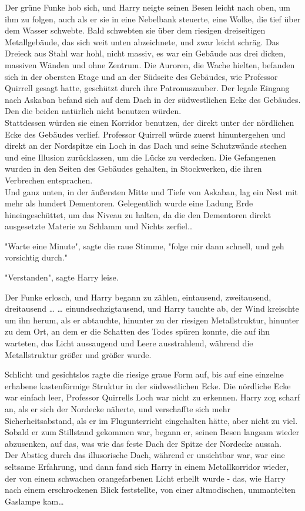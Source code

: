 {Der grüne Funke hob sich, und Harry neigte seinen Besen leicht nach oben, um ihm zu folgen, auch als er sie in eine Nebelbank steuerte, eine Wolke, die tief über dem Wasser schwebte. Bald schwebten sie über dem riesigen dreiseitigen Metallgebäude, das sich weit unten abzeichnete, und zwar leicht schräg. Das Dreieck aus Stahl war hohl, nicht massiv, es war ein Gebäude aus drei dicken, massiven Wänden und ohne Zentrum. Die Auroren, die Wache hielten, befanden sich in der obersten Etage und an der Südseite des Gebäudes, wie Professor Quirrell gesagt hatte, geschützt durch ihre Patronuszauber. Der legale Eingang nach Askaban befand sich auf dem Dach in der südwestlichen Ecke des Gebäudes. Den die beiden natürlich nicht benutzen würden.\\ Stattdessen würden sie einen Korridor benutzen, der direkt unter der nördlichen Ecke des Gebäudes verlief. Professor Quirrell würde zuerst hinuntergehen und direkt an der Nordspitze ein Loch in das Dach und seine Schutzwände stechen und eine Illusion zurücklassen, um die Lücke zu verdecken. Die Gefangenen wurden in den Seiten des Gebäudes gehalten, in Stockwerken, die ihren Verbrechen entsprachen.\\ Und ganz unten, in der äußersten Mitte und Tiefe von Askaban, lag ein Nest mit mehr als hundert Dementoren. Gelegentlich wurde eine Ladung Erde hineingeschüttet, um das Niveau zu halten, da die den Dementoren direkt ausgesetzte Materie zu Schlamm und Nichts zerfiel…

"Warte eine Minute", sagte die raue Stimme, "folge mir dann schnell, und geh vorsichtig durch."

"Verstanden", sagte Harry leise.

Der Funke erlosch, und Harry begann zu zählen, eintausend, zweitausend, dreitausend … … einundsechzigtausend, und Harry tauchte ab, der Wind kreischte um ihn herum, als er abtauchte, hinunter zu der riesigen Metallstruktur, hinunter zu dem Ort, an dem er die Schatten des Todes spüren konnte, die auf ihn warteten, das Licht aussaugend und Leere ausstrahlend, während die Metallstruktur größer und größer wurde.

Schlicht und gesichtslos ragte die riesige graue Form auf, bis auf eine einzelne erhabene kastenförmige Struktur in der südwestlichen Ecke. Die nördliche Ecke war einfach leer, Professor Quirrells Loch war nicht zu erkennen. Harry zog scharf an, als er sich der Nordecke näherte, und verschaffte sich mehr Sicherheitsabstand, als er im Flugunterricht eingehalten hätte, aber nicht zu viel. Sobald er zum Stillstand gekommen war, begann er, seinen Besen langsam wieder abzusenken, auf das, was wie das feste Dach der Spitze der Nordecke aussah.\\ Der Abstieg durch das illusorische Dach, während er unsichtbar war, war eine seltsame Erfahrung, und dann fand sich Harry in einem Metallkorridor wieder, der von einem schwachen orangefarbenen Licht erhellt wurde - das, wie Harry nach einem erschrockenen Blick feststellte, von einer altmodischen, ummantelten Gaslampe kam…

}
